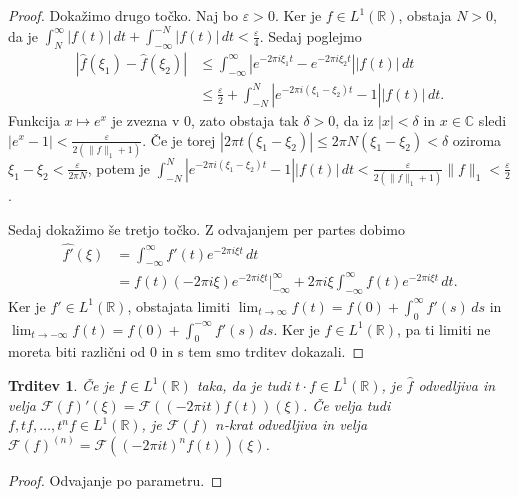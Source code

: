 \documentclass[10pt, a4paper]{article}
\newtheorem{trditev}[izr]{Trditev}
\newenvironment{noticeC}{%
  \tcolorbox[%
  notitle,
  empty,
  enhanced,  %
  breakable,
  coltext=black, 
  fontupper=\rmfamily,
  parbox=false,
  noparskip,
  sharp corners,
  boxrule=-1pt,  %
  frame hidden,
  left=7pt,  %
  right=7pt,
  top=5pt,
  bottom=5pt,
  before skip=2.5ex plus 2pt,
  after skip=2.5ex plus 2pt,
  overlay unbroken and last={%
  },
  ]}
{\endtcolorbox}
\newenvironment{dokaz}%
  {\begin{noticeC}\begin{proof}}%
  {\end{proof}\end{noticeC}}
\newcommand{\R}{\mathbb {R}}
\newcommand{\C}{\mathbb {C}}
\newcommand{\F}{\mathcal{F}}
\begin{document}
\begin{dokaz}
    Dokažimo drugo točko. Naj bo $\varepsilon > 0$.
    Ker je $f \in L^1 (\R)$, obstaja $N > 0$, da je 
    $\int_N ^\infty |f(t)|\, dt + \int_{-\infty} ^{-N} |f(t)|\, dt < \frac{\varepsilon}{4}$.
    Sedaj poglejmo 
    \begin{align*}
        |\hat{f} (\xi_1) - \hat{f} (\xi_2)| &\leq \int_{-\infty} ^\infty |e^{-2\pi i\xi_1 t} - e^{-2\pi i\xi_2 t}| |f(t)|\, dt\\
        &\leq \frac{\varepsilon}{2} + \int_{-N} ^N |e^{-2\pi i (\xi_1 - \xi_2)t} -1| |f(t)|\, dt.
    \end{align*}
    Funkcija $x \mapsto e^x$ je zvezna v $0$, zato obstaja tak $\delta > 0$,
    da iz $|x| < \delta$ in $x \in \C$ sledi $|e^x - 1| < \frac{\varepsilon}{2(\|f\|_1 + 1)}$.
    Če je torej $|2\pi t (\xi_1 - \xi_2)| \leq 2 \pi N (\xi_1 - \xi_2) < \delta$ oziroma 
    $\xi_1 - \xi_2 < \frac{\varepsilon}{2 \pi N}$,
    potem je $\int_{-N} ^N |e^{-2\pi i (\xi_1 - \xi_2)t} -1| |f(t)|\, dt < \frac{\varepsilon}{2(\|f\|_1 + 1)} \|f\|_1 < \frac{\varepsilon}{2}$.

    Sedaj dokažimo še tretjo točko. Z odvajanjem per partes dobimo
    \begin{align*}
        \widehat{f'} (\xi) &= \int_{-\infty} ^\infty f'(t) e^{-2\pi i \xi t}\, dt\\
        &= f(t) (-2 \pi i \xi) e^{-2\pi i \xi t} \Big|_{-\infty} ^\infty + 2 \pi i \xi \int_{-\infty} ^\infty f(t) e^{-2\pi i \xi t}\, dt.
    \end{align*}
    Ker je $f' \in L^1 (\R)$, obstajata limiti $\lim_{t \to \infty} f(t) = f(0) + \int_0 ^\infty f'(s)\, ds$ in 
    $\lim_{t \to -\infty} f(t) = f(0) + \int_0 ^{-\infty} f'(s)\, ds$.
    Ker je $f \in L^1 (\R)$, pa ti limiti ne moreta biti različni od $0$ in s tem smo trditev dokazali.
\end{dokaz}

\begin{trditev}
    Če je $f \in L^1 (\R)$ taka, da je tudi $t \cdot f \in L^1 (\R)$,
    je $\hat{f}$ odvedljiva in velja $\F (f)' (\xi) = \F ((-2 \pi i t) f(t)) (\xi)$.
    Če velja tudi $f, tf, \dots, t^n f \in L^1 (\R)$, je $\F (f)$ $n$-krat odvedljiva 
    in velja $\F(f) ^{(n)} = \F ((-2 \pi i t)^n f(t)) (\xi)$.
\end{trditev}

\begin{dokaz}
    Odvajanje po parametru.
\end{dokaz}
\end{document}
